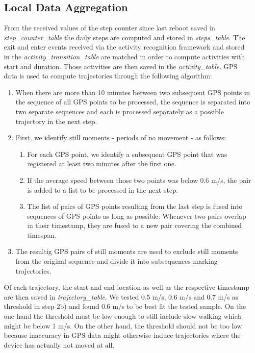 \subsection{Local Data Aggregation}
From the received values of the step counter since last reboot saved in \textit{step\_counter\_table} the daily steps are computed and stored in \textit{steps\_table}. The exit and enter events received via the activity recognition framework and stored in the \textit{activity\_transition\_table} are matched in order to compute activities with start and duration. Those activities are then saved in the \textit{activity\_table}.
GPS data is used to compute trajectories through the following algorithm:
\begin{enumerate}
	\item When there are more than 10 minutes between two subsequent GPS points in the sequence of all GPS points to be processed, the sequence is separated into two separate sequences and each is processed separately as a possible trajectory in the next step.
	\item First, we identify still moments - periods of no movement - as follows:
	\begin{enumerate}
		\item For each GPS point, we identify a subsequent GPS point that was registered at least two minutes after the first one.
		\item If the average speed between those two points was below 0.6 m/s, the pair is added to a list to be processed in the next step.
		\item The list of pairs of GPS points resulting from the last step is fused into sequences of GPS points as long as possible: Whenever two pairs overlap in their timestamp, they are fused to a new pair covering the combined timespan.
	\end{enumerate}
	\item The resultig GPS pairs of still moments are used to exclude still moments from the original sequence and divide it into subsequences marking trajectories.
\end{enumerate}
Of each trajectory, the start and end location as well as the respective timestamp are then saved in \textit{trajectory\_table}. We tested 0.5 m/s, 0.6 m/s and 0.7 m/s as threshold in step 2b) and found 0.6 m/s to be best fit the tested sample. On the one hand the threshold must be low enough to still include slow walking which might be below 1 m/s. On the other hand, the threshold should not be too low because inaccuracy in GPS data might otherwise induce trajectories where the device has actually not moved at all.

